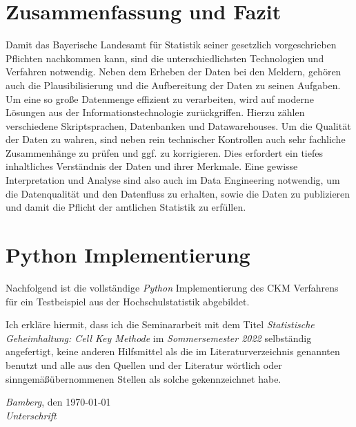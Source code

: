 \section{Zusammenfassung und Fazit}

Damit das Bayerische Landesamt für Statistik seiner gesetzlich vorgeschrieben Pflichten nachkommen kann, sind die unterschiedlichsten Technologien und Verfahren notwendig. Neben dem Erheben der Daten bei den Meldern, gehören auch die Plausibilisierung und die Aufbereitung der Daten zu seinen Aufgaben. Um eine so große Datenmenge effizient zu verarbeiten, wird auf moderne Lösungen aus der Informationstechnologie zurückgriffen. Hierzu zählen verschiedene Skriptsprachen, Datenbanken und Datawarehouses. Um die Qualität der Daten zu wahren, sind neben rein technischer Kontrollen auch sehr fachliche Zusammenhänge zu prüfen und ggf. zu korrigieren. Dies erfordert ein tiefes inhaltliches Verständnis der Daten und ihrer Merkmale. Eine gewisse Interpretation und Analyse sind also auch im Data Engineering notwendig, um die Datenqualität und den Datenfluss zu erhalten, sowie die Daten zu publizieren und damit die Pflicht der amtlichen Statistik zu erfüllen. 

\newpage%

%

\newpage 
\appendix
\section{Python Implementierung}

Nachfolgend ist die vollständige \textit{Python} Implementierung des CKM Verfahrens für ein Testbeispiel aus der Hochschulstatistik abgebildet.





\newpage 
\noindent%
Ich erkläre hiermit, dass ich die Seminararbeit mit dem Titel \emph{Statistische Geheimhaltung: Cell Key Methode} im \emph{Sommersemester 2022} selbständig angefertigt, keine anderen Hilfsmittel als die im Literaturverzeichnis genannten benutzt und alle aus den Quellen und der Literatur wörtlich oder sinngemä\ss übernommenen Stellen als solche gekennzeichnet habe.%
\bigskip
 
\noindent%
\emph{Bamberg}, den \today\\%
\emph{Unterschrift}%

%

